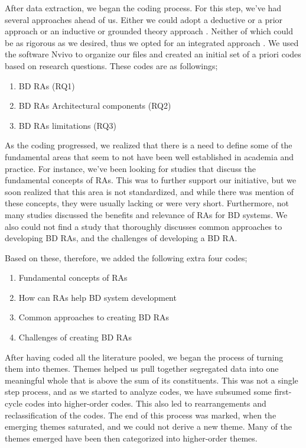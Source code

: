 \documentclass{ieeeaccess}
\begin{document}
After data extraction, we began the coding process. For this step, we've had several approaches ahead of us. Either we could adopt a deductive or a prior approach \cite{miles1994qualitative} or an inductive or grounded theory approach \cite{corbin2014basics}. Neither of which could be as rigorous as we desired, thus we opted for an integrated approach \cite{lofland1971analyzing}. We used the software Nvivo to organize our files and created an initial set of a priori codes based on research questions. These codes are as followings;

\begin{enumerate}
    \item BD RAs (RQ1)
    \item BD RAs Architectural components (RQ2)
    \item BD RAs limitations (RQ3)
\end{enumerate}

As the coding progressed, we realized that there is a need to define some of the fundamental areas that seem to not have been well established in academia and practice. For instance, we've been looking for studies that discuss the fundamental concepts of RAs. This was to further support our initiative, but we soon realized that this area is not standardized, and while there was mention of these concepts, they were usually lacking or were very short. Furthermore, not many studies discussed the benefits and relevance of RAs for BD systems. We also could not find a study that thoroughly discusses common approaches to developing BD RAs, and the challenges of developing a BD RA.

Based on these, therefore, we added the following extra four codes;
\begin{enumerate}
    \item Fundamental concepts of RAs
    \item How can RAs help BD system development
    \item Common approaches to creating BD RAs
    \item Challenges of creating BD RAs
\end{enumerate}

After having coded all the literature pooled, we began the process of turning them into themes. Themes helped us pull together segregated data into one meaningful whole that is above the sum of its constituents. This was not a single step process, and as we started to analyze codes, we have subsumed some first-cycle codes into higher-order codes. This also led to rearrangements and reclassification of the codes. The end of this process was marked, when the emerging themes saturated, and we could not derive a new theme. Many of the themes emerged have been then categorized into higher-order themes. 
\end{document}
